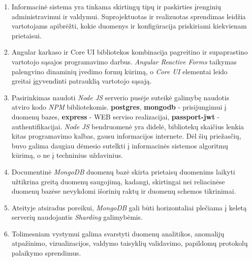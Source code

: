 \documentclass{VUMIFInfBakalaurinis}
\begin{document}
\begin{enumerate}
\item
Informacinė sistema yra tinkama skirtingų tipų ir paskirties įrenginių administravimui ir valdymui.
Suprojektuotas ir realizuotas sprendimas leidžia vartotojams apibrėžti, kokie duomenys ir konfigūracija priskiriami kiekvienam prietaisui.

\item Angular karkaso ir Core UI bibliotekos kombinacija pagreitino ir supaprastino vartotojo sąsajos programavimo darbus.
\emph{Angular Reactive Forms} taikymas palengvino dinaminių įvedimo formų kūrimą,
o \emph{Core UI} elementai leido greitai įgyvendinti patrauklią vartotojo sąsają.

\item Pasirinkimas naudoti \emph{Node JS} serverio pusėje suteikė galimybę naudotis atviro kodo \emph{NPM} bibliotekomis.
\textbf{postgres}, \textbf{mongodb} - prisijungimui į duomenų bazes, \textbf{express} - WEB serviso realizacijai, \textbf{passport-jwt} - authentifikacijai.
\emph{Node JS} bendruomenė yra didelė, bibliotekų skaičius lenkia kitas programavimo kalbas, gausu informacijos internete.
Dėl šių priežasčių, buvo galima daugiau dėmesio sutelkti į informacinės sistemos algoritmų kūrimą, o ne į techninius uždavinius.

\item Documentinė \emph{MongoDB} duomenų bazė skirta prietaisų duomenims laikyti užtikrina greitą duomenų saugojimą,
kadangi, skirtingai nei reliacinėse duomenų bazėse nevykdomi išorinių raktų ir duomenų schemos tikrinimai.

\item Ateityje atsiradus poreikui, \emph{MongoDB} gali būti horizontaliai plečiama į keletą serverių naudojantis \emph{Sharding} galimybėmis.

\item Tolimesniam vystymui galima svarstyti duomenų analitikos, anomalijų atpažinimo, vizualizacijos,
valdymo taisyklių validavimo, papildomų protokolų palaikymo sprendimus.
\end{enumerate}
\end{document}
